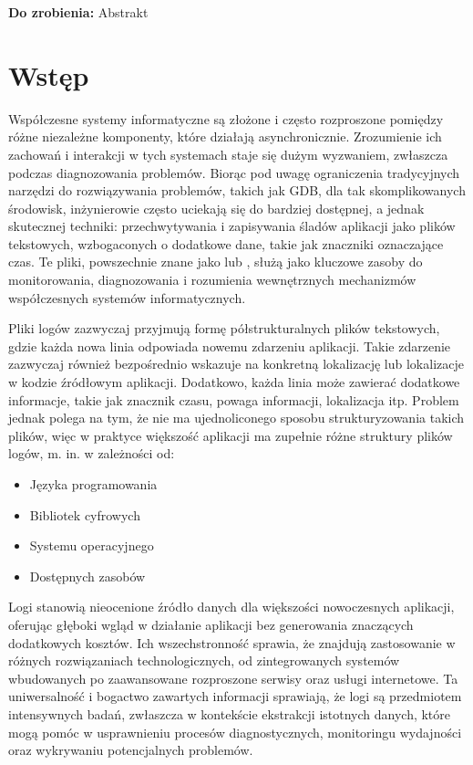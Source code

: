 \documentclass{pginz}
\newcommand{\todo}[1]{\textbf{Do zrobienia: } #1}
\begin{document}

% 
\setcounter{page}{3}

\todo{Abstrakt}

\tableofcontents
{}

\newpage

\chapter{Wstęp}

Współczesne systemy informatyczne są złożone i często rozproszone pomiędzy różne niezależne komponenty, które działają asynchronicznie.
Zrozumienie ich zachowań i interakcji w tych systemach staje się dużym wyzwaniem, zwłaszcza podczas diagnozowania problemów.
Biorąc pod uwagę ograniczenia tradycyjnych narzędzi do rozwiązywania problemów, takich jak GDB, dla tak skomplikowanych środowisk,
inżynierowie często uciekają się do bardziej dostępnej, a jednak skutecznej techniki:
przechwytywania i zapisywania śladów aplikacji jako plików tekstowych, wzbogaconych o dodatkowe dane, takie jak znaczniki oznaczające czas.
Te pliki, powszechnie znane jako  lub , służą jako kluczowe zasoby do monitorowania, diagnozowania i rozumienia wewnętrznych mechanizmów współczesnych systemów informatycznych.

Pliki logów zazwyczaj przyjmują formę półstrukturalnych plików tekstowych, gdzie każda nowa linia odpowiada nowemu zdarzeniu aplikacji.
Takie zdarzenie zazwyczaj również bezpośrednio wskazuje na konkretną lokalizację lub lokalizacje w kodzie źródłowym aplikacji.
Dodatkowo, każda linia może zawierać dodatkowe informacje, takie jak znacznik czasu, powaga informacji, lokalizacja itp.
Problem jednak polega na tym, że nie ma ujednoliconego sposobu strukturyzowania
takich plików, więc w praktyce większość aplikacji ma zupełnie różne struktury plików logów\cite{LogTypes}, m. in. w zależności od:

\begin{itemize}
  \item Języka programowania
  \item Bibliotek cyfrowych
  \item Systemu operacyjnego
  \item Dostępnych zasobów
\end{itemize}

Logi stanowią nieocenione źródło danych dla
większości nowoczesnych aplikacji, oferując głęboki wgląd w działanie aplikacji
bez generowania znaczących dodatkowych kosztów.
Ich wszechstronność sprawia, że znajdują zastosowanie w różnych rozwiązaniach
technologicznych, od zintegrowanych systemów wbudowanych po zaawansowane
rozproszone serwisy oraz usługi internetowe.
Ta uniwersalność i bogactwo zawartych informacji sprawiają, że logi są
przedmiotem intensywnych badań, zwłaszcza w kontekście ekstrakcji istotnych
danych, które mogą pomóc w usprawnieniu procesów diagnostycznych, monitoringu
wydajności oraz wykrywaniu potencjalnych problemów.
\end{document}
